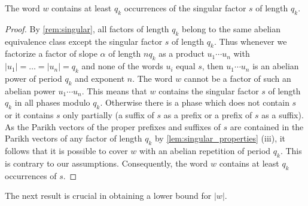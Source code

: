 \documentclass[a4paper,fleqn]{article}
\providecommand{\abs}[1]{\lvert#1\rvert}
\begin{document}
  \begin{claim}\label{cl:s_occurrences}
    The word $w$ contains at least $q_k$ occurrences of the singular factor $s$ of length $q_k$.
  \end{claim}
  \begin{proof}
    By \autoref{rem:singular}, all factors of length $q_k$ belong to the same abelian equivalence class except the
    singular factor $s$ of length $q_k$. Thus whenever we factorize a factor of slope $\alpha$ of length $nq_k$ as a
    product $u_1 \dotsm u_n$ with $\abs{u_1} = \ldots = \abs{u_n} = q_k$ and none of the words $u_i$ equal $s$, then
    $u_1 \dotsm u_n$ is an abelian power of period $q_k$ and exponent $n$. The word $w$ cannot be a factor of such an
    abelian power $u_1 \dotsm u_n$. This means that $w$ contains the singular factor $s$ of length $q_k$ in all phases
    modulo $q_k$. Otherwise there is a phase which does not contain $s$ or it contains $s$ only partially (a suffix of
    $s$ as a prefix or a prefix of $s$ as a suffix). As the Parikh vectors of the proper prefixes and suffixes of $s$
    are contained in the Parikh vectors of any factor of length $q_k$ by \autoref{lem:singular_properties} (iii), it
    follows that it is possible to cover $w$ with an abelian repetition of period $q_k$. This is contrary to our
    assumptions. Consequently, the word $w$ contains at least $q_k$ occurrences of $s$.
  \end{proof}
   
  The next result is crucial in obtaining a lower bound for $\abs{w}$.
\end{document}
